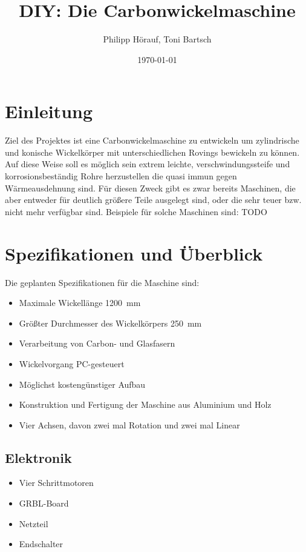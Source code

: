 \documentclass[12pt, a4paper, ngerman]{article}
\date{\today}
\author{Philipp Hörauf, Toni Bartsch}
\title{DIY: Die Carbonwickelmaschine}
\begin{document}
\maketitle
\newpage
\tableofcontents
\newpage
\section{Einleitung}
Ziel des Projektes ist eine Carbonwickelmaschine zu entwickeln um zylindrische und konische Wickelkörper mit unterschiedlichen Rovings bewickeln zu können. Auf diese Weise soll es möglich sein extrem leichte, verschwindungssteife und korrosionsbeständig Rohre herzustellen die quasi immun gegen Wärmeausdehnung sind. Für diesen Zweck gibt es zwar bereits Maschinen, die aber entweder für deutlich größere Teile ausgelegt sind, oder die sehr teuer bzw. nicht mehr verfügbar sind. Beispiele für solche Maschinen sind: TODO

\section{Spezifikationen und Überblick}
Die geplanten Spezifikationen für die Maschine sind:

\begin{itemize}
    \item Maximale Wickellänge \SI{1200}{\milli\metre}
    \item Größter Durchmesser des Wickelkörpers \SI{250}{\milli\metre}
    \item Verarbeitung von Carbon- und Glasfasern
    \item Wickelvorgang PC-gesteuert
    \item Möglichst kostengünstiger Aufbau
    \item Konstruktion und Fertigung der Maschine aus Aluminium und Holz
    \item Vier Achsen, davon zwei mal Rotation und zwei mal Linear
\end{itemize}

\subsection{Elektronik}
\begin{itemize}
    \item Vier Schrittmotoren
    \item GRBL-Board 
    \item Netzteil
    \item Endschalter
\end{itemize}
\end{document}

